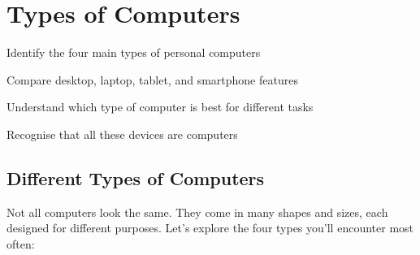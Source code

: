 
\chapter{Types of Computers}
\label{ch:types}

\begin{objectives}
  \item Identify the four main types of personal computers
  \item Compare desktop, laptop, tablet, and smartphone features
  \item Understand which type of computer is best for different tasks
  \item Recognise that all these devices are computers
\end{objectives}


\section{Different Types of Computers}
\label{sec:types-computers}

Not all computers look the same. They come in many shapes and sizes, each designed for different purposes. Let's explore the four types you'll encounter most often:

